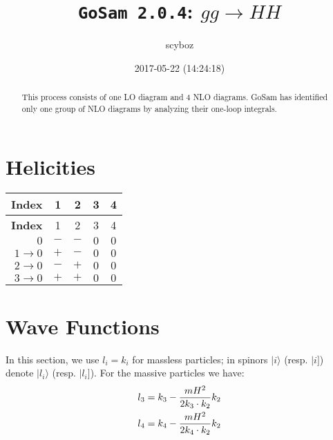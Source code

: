 \documentclass[a4paper]{article}
\title{\texttt{GoSam 2.0.4}: ${g}{g}\rightarrow{H}{H}$}
\author{scyboz}
\date{2017-05-22 (14:24:18)}
\newcommand{\kea}[1]{\vert #1 \rangle}
\newcommand{\keb}[1]{\vert #1 ]}
\begin{document}
\maketitle
\begin{abstract}
\noindent This process consists of one LO diagram and 4 NLO diagrams. GoSam has identified only one group of NLO diagrams by analyzing their one-loop integrals.
\end{abstract}
\newpage
\tableofcontents
\newpage

\section{Helicities}

\begin{longtable}[c]{r|cccc}
\bf{Index} &1&2&3&4\\
\hline
\endfirsthead
\bf{Index} &1&2&3&4\\
\hline
\endhead 
$0$& $-$& $-$& $0$& $0$\\
$1\rightarrow 0$& $+$& $-$& $0$& $0$\\
$2\rightarrow 0$& $-$& $+$& $0$& $0$\\
$3\rightarrow 0$& $+$& $+$& $0$& $0$\\
\end{longtable}
\section{Wave Functions}
In this section, we use $l_i=k_i$ for massless particles;
in spinors $\kea{i}$ (resp. $\keb{i}$) denote $\kea{l_i}$ (resp. $\keb{l_i}$).
For the massive particles we have:
\begin{align}
l_{3} &= k_{3} - \frac{mH^2}{%
      2 k_{3}\cdot k_{2}}k_{2}\\
l_{4} &= k_{4} - \frac{mH^2}{%
      2 k_{4}\cdot k_{2}}k_{2}
\end{align}
\end{document}
